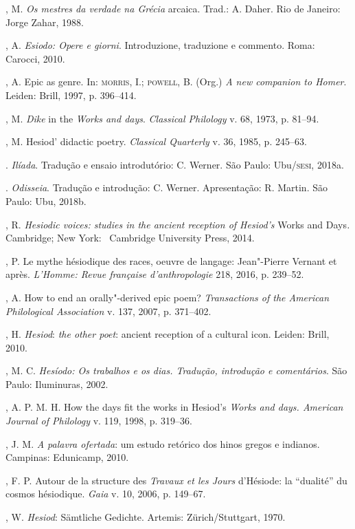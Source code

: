 \begin{bibliohedra}
, M. \emph{Os mestres da verdade na Grécia} arcaica. Trad.: A.
Daher. Rio de Janeiro: Jorge Zahar, 1988.

, A. \emph{Esiodo: Opere e giorni}. Introduzione, traduzione e
commento. Roma: Carocci, 2010.

, A. Epic as genre. In: \textsc{morris}, I.; \textsc{powell}, B. (Org.) \emph{A new
companion to Homer}. Leiden: Brill, 1997, p. 396--414.

, M. \emph{Dike} in the \emph{Works and days}. \emph{Classical
Philology} v. 68, 1973, p. 81--94.

, M. Hesiod' didactic poetry. \emph{Classical Quarterly} v. 36,
1985, p. 245--63.

. \emph{Ilíada}. Tradução e ensaio introdutório: C. Werner. São
Paulo: Ubu/\textsc{sesi}, 2018a.

\titidem. \emph{Odisseia}. Tradução e introdução: C. Werner. Apresentação: R.
Martin. São Paulo: Ubu, 2018b.

, R. \emph{Hesiodic voices: studies in the ancient reception of
Hesiod's} Works and Days\emph{.} Cambridge; New York: ~Cambridge
University Press, 2014.

, P. Le mythe hésiodique des races, oeuvre de langage:
Jean"-Pierre Vernant et après. \emph{L'Homme: Revue française
d'anthropologie} 218, 2016, p. 239--52.

, A. How to end an orally"-derived epic poem? \emph{Transactions of
the American Philological Association} v. 137, 2007, p. 371--402.

, H. \emph{Hesiod}: \emph{the other poet}: ancient reception of a
cultural icon. Leiden: Brill, 2010.

, M. C. \emph{Hesíodo: Os trabalhos e os dias. Tradução, introdução
e comentários}. São Paulo: Iluminuras, 2002.

, A. P. M. H. How the days fit the works in Hesiod's
\emph{Works and days. American Journal of Philology} v. 119, 1998, p.
319--36.

, J. M. \emph{A palavra ofertada}: um estudo retórico dos hinos
gregos e indianos. Campinas: Edunicamp, 2010.

, F. P. Autour de la structure des \emph{Travaux et les Jours}
d'Hésiode: la ``dualité'' du cosmos hésiodique. \emph{Gaia} v. 10, 2006,
p. 149--67.

, W. \emph{Hesiod}: Sämtliche Gedichte. Artemis: Zürich/Stuttgart,
1970.


\end{bibliohedra}
